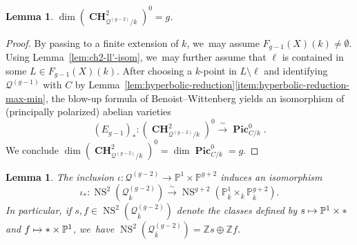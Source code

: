 \documentclass[JEP,XML,SOM,Unicode,NoEqCountersInSection,published]{cedram}
\newcommand\mto{\mathchoice{\longmapsto}{\mapsto}{\mapsto}{\mapsto}}
\theoremstyle{plain}
\newtheorem{lem}[thm]{Lemma}
\theoremstyle{definition}
\DeclareMathOperator{\bCH}{\mathbf{CH}}
\DeclareMathOperator{\NS}{NS}
\DeclareMathOperator{\bPic}{\mathbf{Pic}}
\newcommand{\kbar}{{\overline{k}}}
\renewcommand\P{\mathbb{P}}
\newcommand\Z{\mathbb{Z}}
\begin{document}
\begin{lem}\label{lem:Zbetti3}
$\dim (\bCH^2_{\mathcal{Q}^{(g-2)}/k})^0=g$.
\end{lem}

\begin{proof}
By passing to a finite extension of $k$, we~may assume $F_{g-1}(X)(k)\neq \emptyset$.
Using Lemma~\ref{lem:ch2-ll'-isom}, we~may further assume that $\ell$ is contained in some $L\in F_{g-1}(X)(k)$.
After choosing a $k$\nobreakdash-point in $L\setminus \ell$
and identifying $\mathcal{Q}^{(g-1)}$ with $C$ by Lemma~\ref{lem:hyperbolic-reduction}\eqref{item:hyperbolic-reduction-max-min}, the blow-up formula of Benoist--Wittenberg \cite[Prop.\,3.10]{BW-IJ} yields an isomorphism of (principally polarized) abelian varieties
\[
(E_{g-1})_*\colon (\bCH^2_{\mathcal{Q}^{(g-2)}/k})^0\xrightarrow{\;\sim\;}\bPic_{C/k}^0.
\]
We conclude $\dim (\bCH^2_{\mathcal{Q}^{(g-2)}/k})^0=\dim \bPic_{C/k}^0=g$.
\end{proof}

\begin{lem}\label{lem:NS2-Q-g-2}
The inclusion $\iota\colon \mathcal{Q}^{(g-2)}\to \P^1\times \P^{g+2}$ induces an isomorphism
\[
\iota_*\colon \NS^2(\mathcal{Q}^{(g-2)}_{\kbar})\xrightarrow{\;\sim\;}\NS^{g+2}(\P^1_{\kbar}\times_{\kbar}\P^{g+2}_{\kbar}).
\]
In particular, if \(s,f \in \NS^2(\mathcal{Q}^{(g-2)}_{\kbar})\) denote the classes defined by $s\mto \P^1\times*$ and $f\mto *\times \P^1$, we~have \(\NS^2(\mathcal{Q}^{(g-2)}_{\kbar})=\Z s\oplus \Z f\).
\end{lem}
\end{document}
